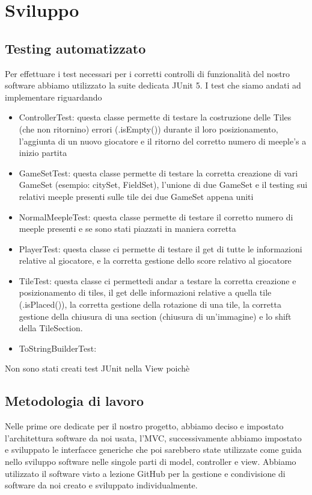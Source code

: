 \section{Sviluppo}
\subsection{Testing automatizzato}
Per effettuare i test necessari per i corretti controlli di funzionalità del nostro software abbiamo utilizzato la suite dedicata JUnit 5. I test che siamo andati ad implementare riguardando
\begin{itemize}
    \item ControllerTest: questa classe permette di testare la costruzione delle Tiles (che non ritornino) errori (.isEmpty()) durante il loro posizionamento, l'aggiunta di un nuovo giocatore e il ritorno del corretto numero di meeple's a inizio partita
    \item GameSetTest: questa classe permette di testare la corretta creazione di vari GameSet (esempio: citySet, FieldSet), l'unione di due GameSet e il testing sui relativi meeple presenti sulle tile dei due GameSet appena uniti 
    \item NormalMeepleTest: questa classe permette di testare il corretto numero di meeple presenti e se sono stati piazzati in maniera corretta
    \item PlayerTest: questa classe ci permette di testare il get di tutte le informazioni relative al giocatore, e la corretta gestione dello score relativo al giocatore
    \item TileTest: questa classe ci permettedi andar a testare la corretta creazione e posizionamento di tiles, il get delle informazioni relative a quella tile (.isPlaced()), la corretta gestione della rotazione di una tile, la corretta gestione della chiusura di una section (chiusura di un'immagine) e lo shift della TileSection.
    \item ToStringBuilderTest:
\end{itemize}
Non sono stati creati test JUnit nella View poichè 

\subsection{Metodologia di lavoro}
Nelle prime ore dedicate per il nostro progetto, abbiamo deciso e impostato l'architettura software da noi usata, l'MVC, successivamente abbiamo impostato e sviluppato le interfacce generiche che poi sarebbero state utilizzate come guida nello sviluppo software nelle singole parti di model, controller e view. Abbiamo utilizzato il software visto a lezione GitHub per la gestione e condivisione di software da noi creato e sviluppato individualmente.

